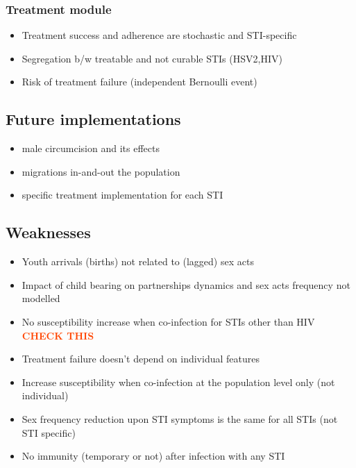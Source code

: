\documentclass[11pt, onecolumn]{article}
\newcommand{\warning}[1]{\textbf{\textcolor{OrangeRed}{#1}}}
\begin{document}
\begin{footnotesize}
\subsubsection*{Treatment module}
\begin{itemize}
\item Treatment success and adherence are stochastic and STI-specific
\item Segregation b/w treatable and not curable STIs (HSV2,HIV)
\item Risk of treatment failure (independent Bernoulli event)
\end{itemize}


\subsection{Future implementations}
\begin{itemize}
\item male circumcision and its effects
\item migrations in-and-out the population
\item specific treatment implementation for each STI
\end{itemize}


\subsection{Weaknesses}
\begin{itemize}
\item Youth arrivals (births) not related to (lagged) sex acts
\item Impact of child bearing on partnerships dynamics and sex acts frequency not modelled
\item No susceptibility increase when co-infection for STIs other than HIV \warning{CHECK THIS}
\item Treatment failure doesn't depend on individual features
\item Increase susceptibility when co-infection at the population level only (not individual)
\item Sex frequency reduction upon STI symptoms is the same for all STIs (not STI specific)
\item No immunity (temporary or not) after infection with any STI
\end{itemize}
\end{footnotesize}

\onecolumn


\end{document}
